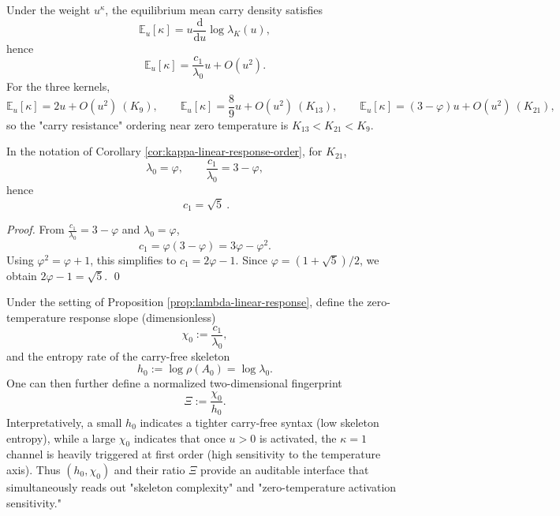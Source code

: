 \begin{corollary}\label{cor:kappa-linear-response-order}
Under the weight $u^{\kappa}$, the equilibrium mean carry density satisfies
\[
\mathbb{E}_u[\kappa]=u\frac{\mathrm{d}}{\mathrm{d}u}\log\lambda_K(u),
\]
hence
\[
\mathbb{E}_u[\kappa]=\frac{c_1}{\lambda_0}u+O(u^2).
\]
For the three kernels,
\[
\mathbb{E}_u[\kappa]=2u+O(u^2)\ (K_9),\qquad
\mathbb{E}_u[\kappa]=\frac{8}{9}u+O(u^2)\ (K_{13}),\qquad
\mathbb{E}_u[\kappa]=(3-\varphi)u+O(u^2)\ (K_{21}),
\]
so the "carry resistance" ordering near zero temperature is $K_{13}<K_{21}<K_{9}$.
\end{corollary}

\begin{corollary}\label{cor:k21-c1-sqrt5}
In the notation of Corollary \ref{cor:kappa-linear-response-order}, for \(K_{21}\),
\[
\lambda_0=\varphi,\qquad \frac{c_1}{\lambda_0}=3-\varphi,
\]
hence
\[
\boxed{\ c_1=\sqrt5\ }.
\]
\end{corollary}
\begin{proof}
From \(\frac{c_1}{\lambda_0}=3-\varphi\) and \(\lambda_0=\varphi\),
\[
c_1=\varphi(3-\varphi)=3\varphi-\varphi^2.
\]
Using \(\varphi^2=\varphi+1\), this simplifies to
\(
c_1=2\varphi-1
\).
Since \(\varphi=(1+\sqrt5)/2\), we obtain \(2\varphi-1=\sqrt5\). \qed
\end{proof}

\begin{remark}\label{rem:zero-temp-two-scales}
Under the setting of Proposition \ref{prop:lambda-linear-response}, define the zero-temperature response slope (dimensionless)
$$
\chi_0:=\frac{c_1}{\lambda_0},
$$
and the entropy rate of the carry-free skeleton
$$
h_0:=\log\rho(A_0)=\log\lambda_0.
$$
One can then further define a normalized two-dimensional fingerprint
$$
\Xi:=\frac{\chi_0}{h_0}.
$$
Interpretatively, a small \(h_0\) indicates a tighter carry-free syntax (low skeleton entropy), while a large \(\chi_0\) indicates that once \(u>0\) is activated, the \(\kappa=1\) channel is heavily triggered at first order (high sensitivity to the temperature axis). Thus \((h_0,\chi_0)\) and their ratio \(\Xi\) provide an auditable interface that simultaneously reads out "skeleton complexity" and "zero-temperature activation sensitivity."
\end{remark}

